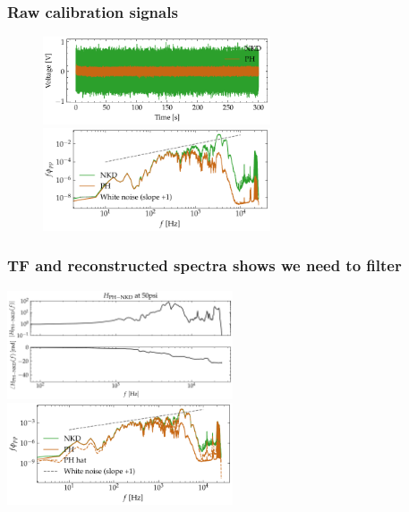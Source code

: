 \documentclass[aspectratio=169,9pt]{beamer}
\begin{document}
\begin{frame}
  \frametitle{Raw calibration signals}
  \begin{figure}
    \centering
    \includegraphics[width=0.6\textwidth]{sanity/50psi/PH-NKD/calib_ts_signals_50psi_nonoise.pdf}
    \includegraphics[width=0.6\textwidth]{sanity/50psi/PH-NKD/calib_spectra_50psi_nonoise.pdf}
  \end{figure}
\end{frame}

\begin{frame}
    \frametitle{TF and reconstructed spectra shows we need to filter}
        \centering
        \includegraphics[width=0.5\textwidth]{sanity/50psi/PH-NKD/H_50psi_nn.png}
        \includegraphics[width=0.5\textwidth]{sanity/50psi/PH-NKD/calib_spectra_50psi_nn_recon.pdf}

        
\end{frame}
\end{document}
